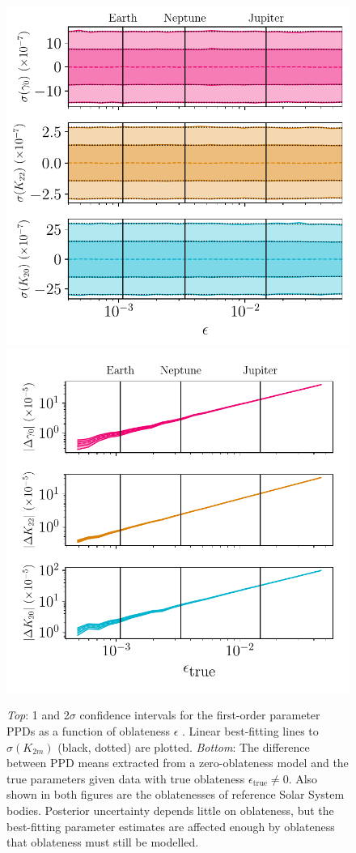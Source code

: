 \documentclass[fleqn,usenatbib]{mnras}
\begin{document}
\begin{figure}
  \centering
  \includegraphics[width=0.88\columnwidth]{figs/oblateness.pdf}
  \vfill
  \includegraphics[width=0.88\columnwidth]{figs/oblateness-differ.pdf}
  \caption{\textit{Top}: 1 and 2$\sigma$ confidence intervals for the first-order parameter PPDs as a function of oblateness $\epsilon$ . Linear best-fitting lines to $\sigma(K_{2m})$ (black, dotted) are plotted. \textit{Bottom}: The difference between PPD means extracted from a zero-oblateness model and the true parameters given data with true oblateness $\epsilon_\text{true} \neq 0$. Also shown in both figures are the oblatenesses of reference Solar System bodies. Posterior uncertainty depends little on oblateness, but the best-fitting parameter estimates are affected enough by oblateness that oblateness must still be modelled.}
  \label{fig:scan-oblateness}
\end{figure}
\end{document}
